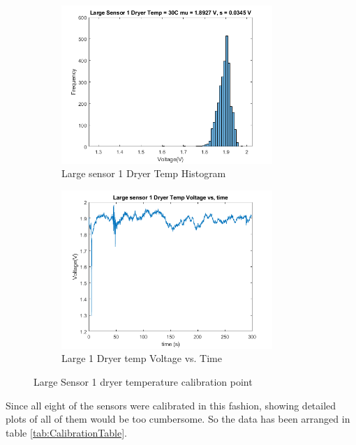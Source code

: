 \documentclass[12pt,a4paper]{report}
\begin{document}
\begin{figure}[h!]
\begin{subfigure}{0.5\textwidth}
    \includegraphics[width=1\linewidth, height=6cm]{Images/Large1DryerHist.png}
    \caption{Large sensor 1 Dryer Temp Histogram}
    \label{fig:Large1DryerHist}
\end{subfigure}
\begin{subfigure}{0.5\textwidth}
    \includegraphics[width=1\linewidth, height=6cm]{Images/Large1DryerTime.png}
    \caption{Large 1 Dryer temp Voltage vs. Time}
    \label{fig:Large1DryerTime}
\end{subfigure}
\caption{Large Sensor 1 dryer temperature calibration point}
\label{largeSensor1Dryer}
\end{figure}

Since all eight of the sensors were calibrated in this fashion, showing detailed plots of all of them would be too cumbersome. So the data has been arranged in table \ref{tab:CalibrationTable}.
\end{document}
